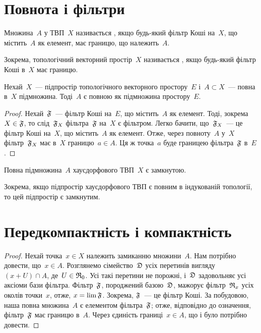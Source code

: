 \section{Повнота і фільтри}

\begin{definition}
    Множина~$A$ у ТВП~$X$ називається , якщо будь-який фільтр Коші на~$X$, що містить~$A$ як елемент, має границю, що належить~$A$.
\end{definition}

\begin{remark}
    Зокрема, топологічний векторний простір~$X$ називається , якщо будь-який фільтр Коші в~$X$ має границю.
\end{remark}

\begin{theorem}
    Нехай~$X$~--- підпростір топологічного векторного простору~$E$ і~$A \subset X$~--- повна в~$X$ підмножина. Тоді~$A$ є повною як підмножина простору~$E$.
\end{theorem}

\begin{proof}
    Нехай~$\frak F$~--- фільтр Коші на~$E$, що містить~$A$ як елемент. Тоді, зокрема~$X \in \frak F$, то слід~$\frak F_X$ фільтра~$\frak F$ на~$X$ є фільтром. Легко бачити, що~$\frak F_X$~--- це фільтр Коші на~$X$, що містить~$A$ як елемент. Отже, через повноту~$A$ у~$X$ фільтр~$\frak F_X$ має в~$X$ границю~$a \in A$. Ця ж точка~$a$ буде границею фільтра~$\frak F$ в~$E$.
\end{proof}

\begin{theorem}
    Повна підмножина~$A$ хаусдорфового ТВП~$X$ є замкнутою.
\end{theorem}

\begin{remark}
    Зокрема, якщо підпростір хаусдорфового ТВП є повним в індукованій топології, то цей підпростір є замкнутим.
\end{remark}

\section{Передкомпактність і компактність}

\begin{proof}
    Нехай точка~$x \in X$ належить замиканню множини~$A$. Нам потрібно довести, що~$x \in A$. Розглянемо сімейство~$\frak D$ усіх перетинів вигляду~$(x + U) \cap A$, де~$U \in \frak R_0$. Усі такі перетини не порожні, і~$\frak D$ задовольняє усі аксіоми бази фільтра. Фільтр~$\frak F$, породжений базою~$\frak D$, мажорує фільтр~$\frak R_x$ усіх околів точки~$x$, отже, $x = \lim \frak F$. Зокрема, $\frak F$~--- це фільтр Коші. За побудовою, наша повна множина~$A$ є елементом фільтра~$\frak F$; отже, відповідно до означення, фільтр~$\frak F$ має границю в~$A$. Через єдиність границі~$x \in A$, що і було потрібно довести.
\end{proof}

